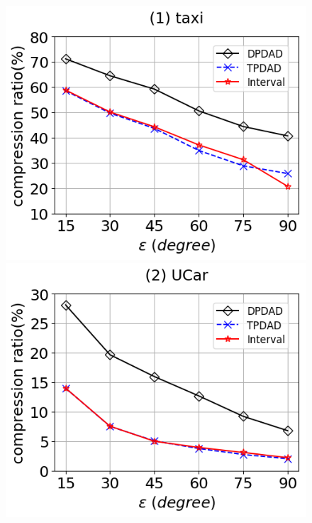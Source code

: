 \begin{figure}[tb!]
	\centering
	\includegraphics[scale=0.315]{Figures/Exp-DAD-CR-epsilon-taxi.png}\hspace{1ex}
	\includegraphics[scale=0.315]{Figures/Exp-DAD-CR-epsilon-service.png} 	\hspace{1ex}

\end{figure}
